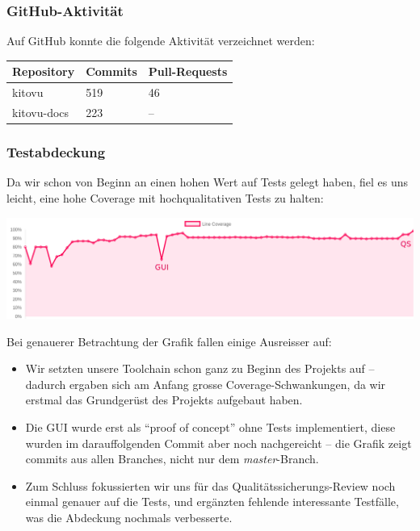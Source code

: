 \documentclass[a4paper]{article}
\begin{document}
\subsubsection{GitHub-Aktivität}

Auf GitHub konnte die folgende Aktivität verzeichnet werden:

\begin{tabulary}{\linewidth}{lll}
  \toprule
  \textbf{Repository} & \textbf{Commits} & \textbf{Pull-Requests} \\
  \midrule
  kitovu & 519 & 46 \\
  kitovu-docs & 223 & -- \\
  \bottomrule
\end{tabulary}

\pagebreak

\subsubsection{Testabdeckung}

Da wir schon von Beginn an einen hohen Wert auf Tests gelegt haben, fiel es uns
leicht, eine hohe Coverage mit hochqualitativen Tests zu halten:

\includegraphics[width=\linewidth]{img/coverage.png}

Bei genauerer Betrachtung der Grafik fallen einige Ausreisser auf:

\begin{itemize}
  \item Wir setzten unsere Toolchain schon ganz zu Beginn des Projekts auf --
    dadurch ergaben sich am Anfang grosse Coverage-Schwankungen, da wir erstmal
    das Grundgerüst des Projekts aufgebaut haben.
  \item Die GUI wurde erst als ``proof of concept'' ohne Tests implementiert,
    diese wurden im darauffolgenden Commit aber noch nachgereicht -- die Grafik
    zeigt commits aus allen Branches, nicht nur dem \emph{master}-Branch.
  \item Zum Schluss fokussierten wir uns für das Qualitätssicherungs-Review noch
    einmal genauer auf die Tests, und ergänzten fehlende interessante Testfälle,
    was die Abdeckung nochmals verbesserte.
\end{itemize}
\end{document}
